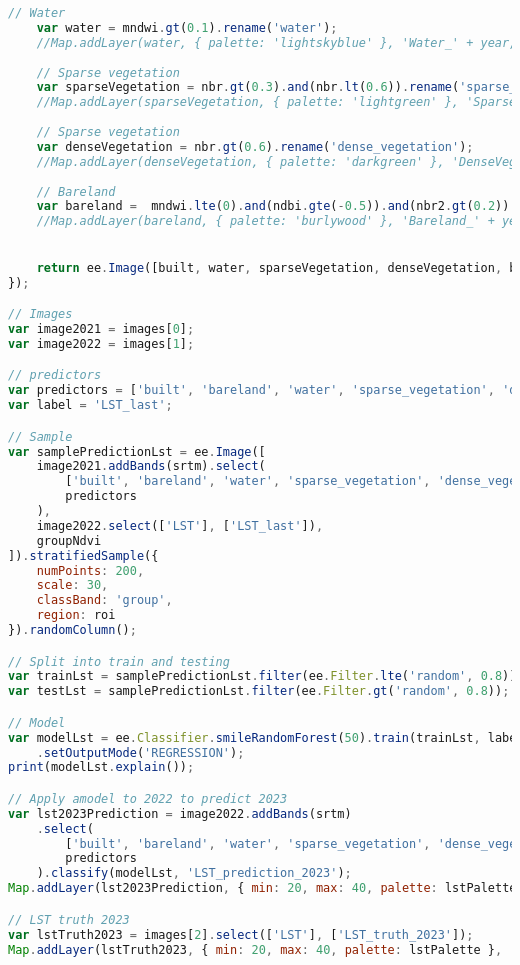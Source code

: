 \begin{lstlisting}[language=JavaScript, label={code:futureLst}, caption={GEE Script to predict future LST}]
	// Water
	var water = mndwi.gt(0.1).rename('water');
	//Map.addLayer(water, { palette: 'lightskyblue' }, 'Water_' + year, false);
	
	// Sparse vegetation
	var sparseVegetation = nbr.gt(0.3).and(nbr.lt(0.6)).rename('sparse_vegetation');
	//Map.addLayer(sparseVegetation, { palette: 'lightgreen' }, 'SparseVegetation_' + year, false);
	
	// Sparse vegetation
	var denseVegetation = nbr.gt(0.6).rename('dense_vegetation');
	//Map.addLayer(denseVegetation, { palette: 'darkgreen' }, 'DenseVegetation_' + year, false);
	
	// Bareland
	var bareland =  mndwi.lte(0).and(ndbi.gte(-0.5)).and(nbr2.gt(0.2)).and(nbr.lte(0.3)).rename('bareland');
	//Map.addLayer(bareland, { palette: 'burlywood' }, 'Bareland_' + year, false);

	
	return ee.Image([built, water, sparseVegetation, denseVegetation, bareland, image.select('LST')]);
});

// Images
var image2021 = images[0];
var image2022 = images[1];

// predictors
var predictors = ['built', 'bareland', 'water', 'sparse_vegetation', 'dense_vegetation', 'elevation', 'LST_first'];
var label = 'LST_last';

// Sample
var samplePredictionLst = ee.Image([
	image2021.addBands(srtm).select(
		['built', 'bareland', 'water', 'sparse_vegetation', 'dense_vegetation', 'elevation', 'LST'], 
		predictors
	),
	image2022.select(['LST'], ['LST_last']),
	groupNdvi
]).stratifiedSample({
	numPoints: 200,
	scale: 30,
	classBand: 'group',
	region: roi
}).randomColumn();

// Split into train and testing
var trainLst = samplePredictionLst.filter(ee.Filter.lte('random', 0.8));
var testLst = samplePredictionLst.filter(ee.Filter.gt('random', 0.8));

// Model
var modelLst = ee.Classifier.smileRandomForest(50).train(trainLst, label, predictors)
	.setOutputMode('REGRESSION');
print(modelLst.explain());

// Apply amodel to 2022 to predict 2023
var lst2023Prediction = image2022.addBands(srtm)
	.select(
		['built', 'bareland', 'water', 'sparse_vegetation', 'dense_vegetation', 'elevation', 'LST'],
		predictors
	).classify(modelLst, 'LST_prediction_2023');
Map.addLayer(lst2023Prediction, { min: 20, max: 40, palette: lstPalette }, 'LST prediction 2023', false);

// LST truth 2023
var lstTruth2023 = images[2].select(['LST'], ['LST_truth_2023']);
Map.addLayer(lstTruth2023, { min: 20, max: 40, palette: lstPalette }, 'LST reference 2023', false);


\end{lstlisting}
